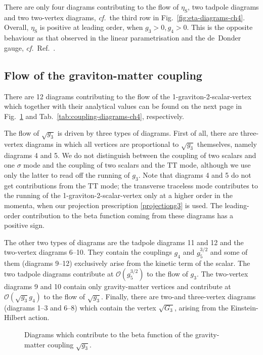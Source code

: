 \documentclass[11pt]{book}
\newcommand\etaS{ \eta_{\scriptscriptstyle{\mathrm{S}}} }
\newcommand\cf{\textit{cf.}\ }
\numberwithin{equation}{chapter}
\begin{document}
There are only four diagrams contributing to the flow of $\etaS$, two tadpole diagrams and two two-vertex diagrams,
\cf the third row in Fig.~\ref{fig:eta-diagrams-ch4}.
Overall, $\etaS$ is positive at leading order, when $g_3>0, g_4>0$.
This is the opposite behaviour as that observed in the linear parametrisation
and the de~Donder gauge, \cf Ref.~\cite{Dona:2013qba}.


\subsection{Flow of the graviton-matter coupling}

There are 12 diagrams contributing to the
flow of the 1-graviton-2-scalar-vertex
which together with their analytical values can be found on
the next page
in Fig.~\ref{fig:coupling-diagrams-ch4} and Tab.~\ref{tab:coupling-diagrams-ch4},
respectively.


The flow of $\sqrt{g_3}$ is driven by three types of diagrams.
First of all, there are three-vertex diagrams in which all
vertices are proportional to $\sqrt{g_3}$ themselves,
namely diagrams 4 and 5.
We do not distinguish between the coupling of two
scalars and one $\sigma$ mode and the coupling of two scalars and
the $\mathrm{TT}$ mode,
although we use only the latter to read off the running of $g_3$.
Note that diagrams 4 and 5 do not get contributions from the $\mathrm{TT}$ mode;
the transverse traceless mode contributes to the running of the
1-graviton-2-scalar-vertex only at a higher order in the momenta,
when our projection prescription \eqref{projectiong3} is used.
The leading-order contribution to the beta function coming from
these diagrams has a positive sign.

The other two types of diagrams are the tadpole diagrams 11 and 12
and the two-vertex diagrams 6--10.
They contain the couplings $g_4$ and $g_5^{3/2}$ and
some of them (diagrams 9--12) exclusively arise from the kinetic term of the scalar.
The two tadpole diagrams contribute at $\mathcal{O}(g_5^{3/2})$ to the flow of $g_3$.
The two-vertex diagrams 9 and 10 contain only gravity-matter vertices and contribute
at $\mathcal{O}(\sqrt{g_3} g_4)$ to the flow of $\sqrt{g_3}$.
Finally, there are two-and three-vertex diagrams (diagrams 1--3 and 6--8)
which contain the vertex $\sqrt{G_3}$, arising from the Einstein-Hilbert action.

\begin{figure}[p]
  \begin{center}
    
  \end{center}
  \caption{
    Diagrams which contribute to the beta function of the gravity-matter coupling
    $\sqrt{g_3}$.
  }
  \label{fig:coupling-diagrams-ch4}
\end{figure}
\end{document}
